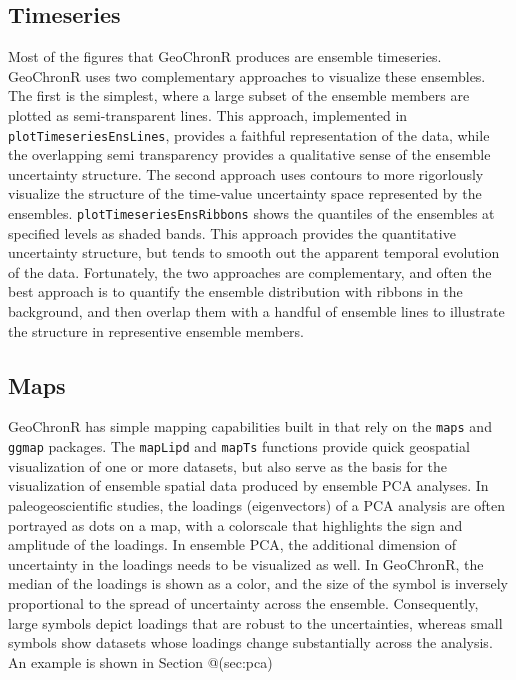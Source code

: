 \documentclass[gc, manuscript]{copernicus}
\begin{document}
\subsection{Timeseries}

Most of the figures that GeoChronR produces are ensemble timeseries.
GeoChronR uses two complementary approaches to visualize these
ensembles. The first is the simplest, where a large subset of the
ensemble members are plotted as semi-transparent lines. This approach,
implemented in \texttt{plotTimeseriesEnsLines}, provides a faithful
representation of the data, while the overlapping semi transparency
provides a qualitative sense of the ensemble uncertainty structure. The
second approach uses contours to more rigorlously visualize the
structure of the time-value uncertainty space represented by the
ensembles. \texttt{plotTimeseriesEnsRibbons} shows the quantiles of the
ensembles at specified levels as shaded bands. This approach provides
the quantitative uncertainty structure, but tends to smooth out the
apparent temporal evolution of the data. Fortunately, the two approaches
are complementary, and often the best approach is to quantify the
ensemble distribution with ribbons in the background, and then overlap
them with a handful of ensemble lines to illustrate the structure in
representive ensemble members.

\subsection{Maps}

GeoChronR has simple mapping capabilities built in that rely on the
\texttt{maps} \citep{maps} and \texttt{ggmap} \citep{ggmap} packages.
The \texttt{mapLipd} and \texttt{mapTs} functions provide quick
geospatial visualization of one or more datasets, but also serve as the
basis for the visualization of ensemble spatial data produced by
ensemble PCA analyses. In paleogeoscientific studies, the loadings
(eigenvectors) of a PCA analysis are often portrayed as dots on a map,
with a colorscale that highlights the sign and amplitude of the
loadings. In ensemble PCA, the additional dimension of uncertainty in
the loadings needs to be visualized as well. In GeoChronR, the median of
the loadings is shown as a color, and the size of the symbol is
inversely proportional to the spread of uncertainty across the ensemble.
Consequently, large symbols depict loadings that are robust to the
uncertainties, whereas small symbols show datasets whose loadings change
substantially across the analysis. An example is shown in Section
@(sec:pca)
\end{document}
